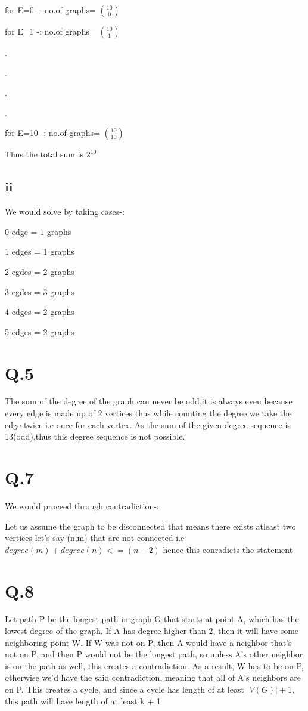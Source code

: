 \documentclass{article}
\begin{document}
       for E=0 -: no.of graphs= ${10\choose  0}$

for E=1 -: no.of graphs= ${10\choose  1}$

    .
    
    .
    
    .
    
    .
    
for E=10 -: no.of graphs= ${10\choose  10}$

Thus the total sum is $2^{10}$
\subsection{ii}
We would solve by taking cases-:

   

0 edge   =     1  graphs

1 edges  =     1   graphs

2   egdes =    2    graphs

3  egdes  =    3   graphs

4  edges =      2   graphs

5  edges =      2   graphs
\section{Q.5}
The sum of the degree of the graph can never be odd,it is always even  because every edge is made up of 2 vertices thus while counting the degree we take the edge twice i.e once for each vertex.
As the sum of the given degree sequence is 13(odd),thus this degree sequence is not possible.

\section{Q.7}
We would proceed through contradiction-:

Let us assume the graph to be disconnected that means there exists atleast two vertices let's say (n,m) that are not connected i.e $degree(m)+degree(n)<=(n-2)$ hence this conradicts the statement

\section{Q.8}
 Let path P be the longest path in graph G that starts at point A, which has the lowest degree of the graph. If A has degree higher than 2, then it will have some neighboring point W. If W was not on P, then A would have a neighbor that's not on P, and then P would not be the longest path, so unless A's other neighbor is on the path as well, this creates a contradiction. As a result, W has to be on P, otherwise we'd have the said contradiction, meaning that all of A's neighbors are on P. This creates a cycle, and since a cycle has length of at least $|V(G)| + 1$, this path will have length of at least k + 1
 
\end{document}

